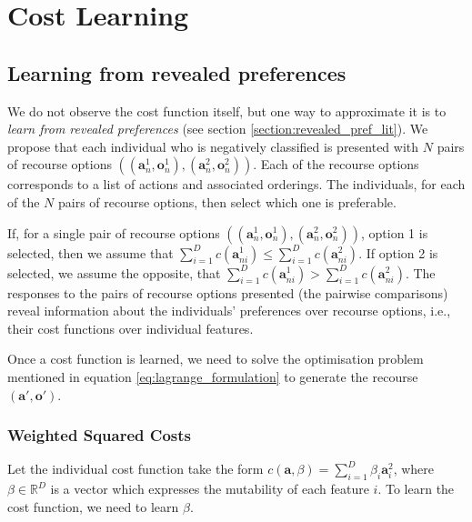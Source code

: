 \chapter{Cost Learning}


\section{Learning from revealed preferences}

We do not observe the cost function itself, but one way to approximate it is to \textit{learn from revealed preferences} (see section \ref{section:revealed_pref_lit}). We propose that each individual who is negatively classified is presented with $N$ pairs of recourse options $((\mathbf{a}_n^1, \mathbf{o}_n^1),(\mathbf{a}_n^2, \mathbf{o}_n^2))$. Each of the recourse options corresponds to a list of actions and associated orderings. The individuals, for each of the $N$ pairs of recourse options, then select which one is preferable. 

If, for a single pair of recourse options $((\mathbf{a}_n^1, \mathbf{o}_n^1),(\mathbf{a}_n^2, \mathbf{o}_n^2))$, option 1 is selected, then we assume that $\sum_{i=1}^D c(\mathbf{a}^1_{ni}) \leq \sum_{i=1}^D c(\mathbf{a}^2_{ni})$. If option 2 is selected, we assume the opposite, that $\sum_{i=1}^D c(\mathbf{a}^1_{ni}) > \sum_{i=1}^D c(\mathbf{a}^2_{ni})$. The responses to the pairs of recourse options presented (the pairwise comparisons) reveal information about the individuals' preferences over recourse options, i.e., their cost functions over individual features. 

Once a cost function is learned, we need to solve the optimisation problem mentioned in equation \ref{eq:lagrange_formulation} to generate the recourse $(\mathbf{a}', \mathbf{o}')$.

\subsection{Weighted Squared Costs}

Let the individual cost function take the form $c(\mathbf{a}, \beta) = \sum_{i=1}^D \beta_i \mathbf{a}^2_i$, where $\beta \in \mathbb{R}^D$ is a vector which expresses the mutability of each feature $i$. To learn the cost function, we need to learn $\beta$.

